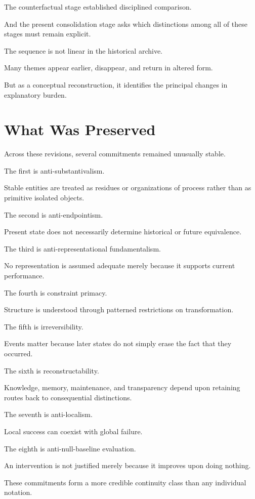 \documentclass[11pt]{article}
\theoremstyle{remark}
\begin{document}
The counterfactual stage established disciplined comparison.

And the present consolidation stage asks which distinctions among all of these stages must remain explicit.

The sequence is not linear in the historical archive.

Many themes appear earlier, disappear, and return in altered form.

But as a conceptual reconstruction, it identifies the principal changes in explanatory burden.

\section{What Was Preserved}

Across these revisions, several commitments remained unusually stable.

The first is anti-substantivalism.

Stable entities are treated as residues or organizations of process rather than as primitive isolated objects.

The second is anti-endpointism.

Present state does not necessarily determine historical or future equivalence.

The third is anti-representational fundamentalism.

No representation is assumed adequate merely because it supports current performance.

The fourth is constraint primacy.

Structure is understood through patterned restrictions on transformation.

The fifth is irreversibility.

Events matter because later states do not simply erase the fact that they occurred.

The sixth is reconstructability.

Knowledge, memory, maintenance, and transparency depend upon retaining routes back to consequential distinctions.

The seventh is anti-localism.

Local success can coexist with global failure.

The eighth is anti-null-baseline evaluation.

An intervention is not justified merely because it improves upon doing nothing.

These commitments form a more credible continuity class than any individual notation.
\end{document}
